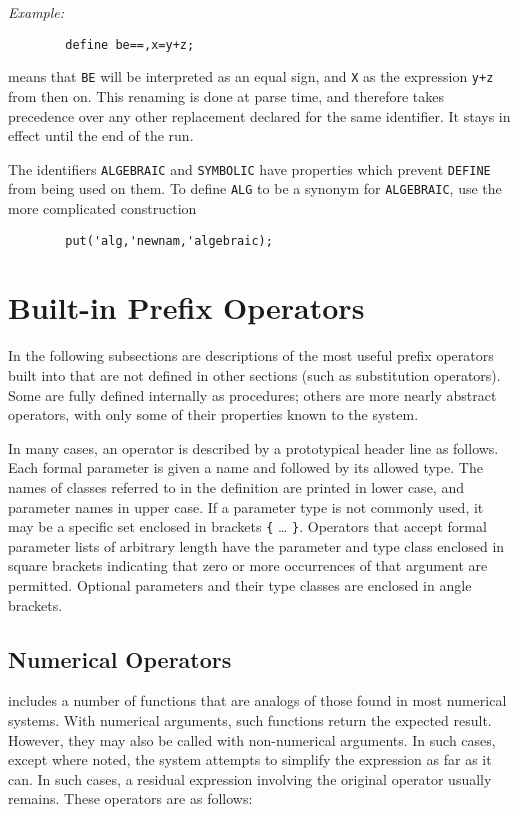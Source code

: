 {\it Example:}
\begin{verbatim}
        define be==,x=y+z;
\end{verbatim}
means that {\tt BE} will be interpreted as an equal sign, and {\tt X}
as the expression {\tt y+z} from then on.  This renaming is done at parse
time, and therefore takes precedence over any other replacement declared
for the same identifier.  It stays in effect until the end of the
{\REDUCE} run.

The identifiers {\tt ALGEBRAIC} and {\tt SYMBOLIC} have properties which
prevent {\tt DEFINE} from being used on them.  To define
{\tt ALG} to be a synonym for {\tt ALGEBRAIC}, use the more complicated
construction
\begin{verbatim}
        put('alg,'newnam,'algebraic);
\end{verbatim}
\chapter{Built-in Prefix Operators}
In the following subsections are descriptions of the most useful prefix
operators built into {\REDUCE} that are not defined in other sections (such
as substitution operators). Some are fully defined internally as
procedures; others are more nearly abstract operators, with only some of
their properties known to the system.

In many cases, an operator is described by a prototypical header line as
follows. Each formal parameter is given a name and followed by its allowed
type. The names of classes referred to in the definition are printed in
lower case, and parameter names in upper case. If a parameter type is not
commonly used, it may be a specific set enclosed in brackets {\tt \{} \ldots
{\tt \}}.
Operators that accept formal parameter lists of arbitrary length have the
parameter and type class enclosed in square brackets indicating that zero
or more occurrences of that argument are permitted. Optional parameters
and their type classes are enclosed in angle brackets.

\section{Numerical Operators}
{\REDUCE} includes a number of functions that are analogs of those found
in most numerical systems.  With numerical arguments, such functions
return the expected result.  However, they may also be called with
non-numerical arguments.  In such cases, except where noted, the system
attempts to simplify the expression as far as it can.  In such cases, a
residual expression involving the original operator usually remains.
These operators are as follows:

